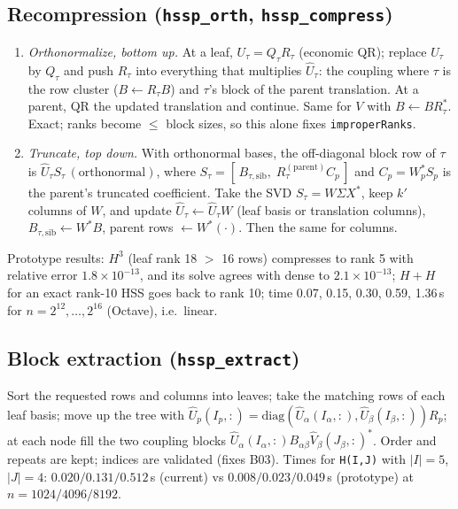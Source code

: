 \documentclass[11pt]{article}
\newcommand{\code}[1]{\texttt{#1}}
\begin{document}
\subsection{Recompression (\code{hssp\_orth}, \code{hssp\_compress})}\label{sec:compress}
\begin{enumerate}
\item \emph{Orthonormalize, bottom up.} At a leaf, $U_\tau=Q_\tau R_\tau$ (economic QR); replace $U_\tau$ by
$Q_\tau$ and push $R_\tau$ into everything that multiplies $\hat U_\tau$: the coupling where $\tau$ is the row
cluster ($B\leftarrow R_\tau B$) and $\tau$'s block of the parent translation. At a parent, QR the updated
translation and continue. Same for $V$ with $B\leftarrow BR_\tau^*$. Exact; ranks become
$\le$ block sizes, so this alone fixes \code{improperRanks}.
\item \emph{Truncate, top down.} With orthonormal bases, the off-diagonal block row of $\tau$ is
$\hat U_\tau S_\tau\,(\text{orthonormal})$, where $S_\tau=[\,B_{\tau,\text{sib}},\;R_\tau^{(\text{parent})}C_{p}\,]$
and $C_p=W_p^*S_p$ is the parent's truncated coefficient. Take the SVD $S_\tau=W\Sigma X^*$, keep $k'$ columns of
$W$, and update $\hat U_\tau\leftarrow \hat U_\tau W$ (leaf basis or translation columns),
$B_{\tau,\text{sib}}\leftarrow W^*B$, parent rows $\leftarrow W^*(\cdot)$. Then the same for columns.
\end{enumerate}
Prototype results: $H^3$ (leaf rank 18 $>$ 16 rows) compresses to rank 5 with relative error $1.8\times10^{-13}$,
and its solve agrees with dense to $2.1\times10^{-13}$; $H+H$ for an exact rank-10 HSS goes back to rank 10;
time 0.07, 0.15, 0.30, 0.59, 1.36\,s for $n=2^{12},\dots,2^{16}$ (Octave), i.e.\ linear.

\subsection{Block extraction (\code{hssp\_extract})}\label{sec:extract}
Sort the requested rows and columns into leaves; take the matching rows of each leaf basis; move up the tree with
$\hat U_p(I_p,:)=\mathrm{diag}(\hat U_\alpha(I_\alpha,:),\hat U_\beta(I_\beta,:))R_p$; at each node fill the two
coupling blocks $\hat U_\alpha(I_\alpha,:)B_{\alpha\beta}\hat V_\beta(J_\beta,:)^*$. Order and repeats are kept;
indices are validated (fixes B03). Times for \code{H(I,J)} with $|I|=5$, $|J|=4$: $0.020/0.131/0.512$\,s
(current) vs $0.008/0.023/0.049$\,s (prototype) at $n=1024/4096/8192$.
\end{document}
